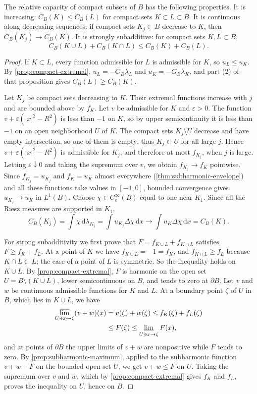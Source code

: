 \begin{proposition}\label{prop:compact-capacity-properties}
The relative capacity of compact subsets of $B$ has the following properties. It is increasing: $C_B(K)\leq C_B(L)$ for compact sets $K\subset L\subset B$. It is continuous along decreasing sequences: if compact sets $K_j\subset B$ decrease to $K$, then $C_B(K_j)\to C_B(K)$. It is strongly subadditive: for compact sets $K,L\subset B$,
\[
 C_B(K\cup L)+C_B(K\cap L)\leq C_B(K)+C_B(L).
\]
\end{proposition}
\begin{proof}
If $K\subset L$, every function admissible for $L$ is admissible for $K$, so $u_L\leq u_K$. By \cref{prop:compact-extremal}, $u_L=-G_B\lambda_L$ and $u_K=-G_B\lambda_K$, and part (2) of that proposition gives $C_B(L)\geq C_B(K)$.

Let $K_j$ be compact sets decreasing to $K$. Their extremal functions increase with $j$ and are bounded above by $f_K$. Let $v$ be admissible for $K$ and $\varepsilon>0$. The function $v+\varepsilon(|x|^2-R^2)$ is less than $-1$ on $K$, so by upper semicontinuity it is less than $-1$ on an open neighborhood $U$ of $K$. The compact sets $K_j\setminus U$ decrease and have empty intersection, so one of them is empty; thus $K_j\subset U$ for all large $j$. Hence $v+\varepsilon(|x|^2-R^2)$ is admissible for $K_j$, and therefore at most $f_{K_j}$, when $j$ is large. Letting $\varepsilon\downarrow0$ and taking the supremum over $v$, we obtain $f_{K_j}\to f_K$ pointwise. Since $f_{K_j}=u_{K_j}$ and $f_K=u_K$ almost everywhere (\cref{thm:subharmonic-envelope}) and all these functions take values in $[-1,0]$, bounded convergence gives $u_{K_j}\to u_K$ in $L^1(B)$. Choose $\chi\in C_c^\infty(B)$ equal to one near $K_1$. Since all the Riesz measures are supported in $K_1$,
\[
 C_B(K_j)=\int\chi\,\mathrm d\lambda_{K_j}=\int u_{K_j}\Delta\chi\,\mathrm d x\longrightarrow\int u_K\Delta\chi\,\mathrm d x=C_B(K).
\]

For strong subadditivity we first prove that $F=f_{K\cup L}+f_{K\cap L}$ satisfies $F\geq f_K+f_L$. At a point of $K$ we have $f_{K\cup L}=-1=f_K$, and $f_{K\cap L}\geq f_L$ because $K\cap L\subset L$; the case of a point of $L$ is symmetric. So the inequality holds on $K\cup L$. By \cref{prop:compact-extremal}, $F$ is harmonic on the open set $U=B\setminus(K\cup L)$, lower semicontinuous on $B$, and tends to zero at $\partial B$. Let $v$ and $w$ be continuous admissible functions for $K$ and $L$. At a boundary point $\zeta$ of $U$ in $B$, which lies in $K\cup L$, we have
\[
 \begin{aligned}
 \varlimsup_{U\ni x\to\zeta}(v+w)(x)&=v(\zeta)+w(\zeta)\leq f_K(\zeta)+f_L(\zeta)\\
 &\leq F(\zeta)\leq\varliminf_{U\ni x\to\zeta}F(x),
 \end{aligned}
\]
and at points of $\partial B$ the upper limits of $v+w$ are nonpositive while $F$ tends to zero. By \cref{prop:subharmonic-maximum}, applied to the subharmonic function $v+w-F$ on the bounded open set $U$, we get $v+w\leq F$ on $U$. Taking the supremum over $v$ and $w$, which by \cref{prop:compact-extremal} gives $f_K$ and $f_L$, proves the inequality on $U$, hence on $B$.


\end{proof}
